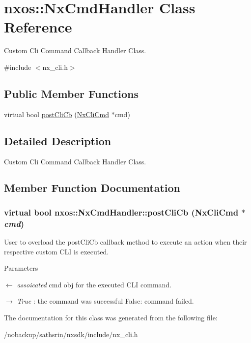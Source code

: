 \hypertarget{classnxos_1_1NxCmdHandler}{
\section{nxos::NxCmdHandler Class Reference}
\label{classnxos_1_1NxCmdHandler}
}


Custom Cli Command Callback Handler Class.  


{\ttfamily \#include $<$nx\_\-cli.h$>$}\subsection*{Public Member Functions}
\begin{DoxyCompactItemize}
\item 
virtual bool \hyperlink{classnxos_1_1NxCmdHandler_ab60a4672e08b1acd1faa249936963ead}{postCliCb} (\hyperlink{classnxos_1_1NxCliCmd}{NxCliCmd} $\ast$cmd)
\end{DoxyCompactItemize}


\subsection{Detailed Description}
Custom Cli Command Callback Handler Class. 

\subsection{Member Function Documentation}
\hypertarget{classnxos_1_1NxCmdHandler_ab60a4672e08b1acd1faa249936963ead}{
\subsubsection[{postCliCb}]{\setlength{\rightskip}{0pt plus 5cm}virtual bool nxos::NxCmdHandler::postCliCb ({\bf NxCliCmd} $\ast$ {\em cmd})}}
\label{classnxos_1_1NxCmdHandler_ab60a4672e08b1acd1faa249936963ead}
User to overload the postCliCb callback method to execute an action when their respective custom CLI is executed. 
\begin{DoxyParams}{Parameters}
\item[\mbox{$\leftarrow$} {\em assoicated}]cmd obj for the executed CLI command. \item[\mbox{$\rightarrow$} {\em True}]: the command was successful False: command failed. \end{DoxyParams}


The documentation for this class was generated from the following file:\begin{DoxyCompactItemize}
\item 
/nobackup/sathsrin/nxsdk/include/nx\_\-cli.h\end{DoxyCompactItemize}
